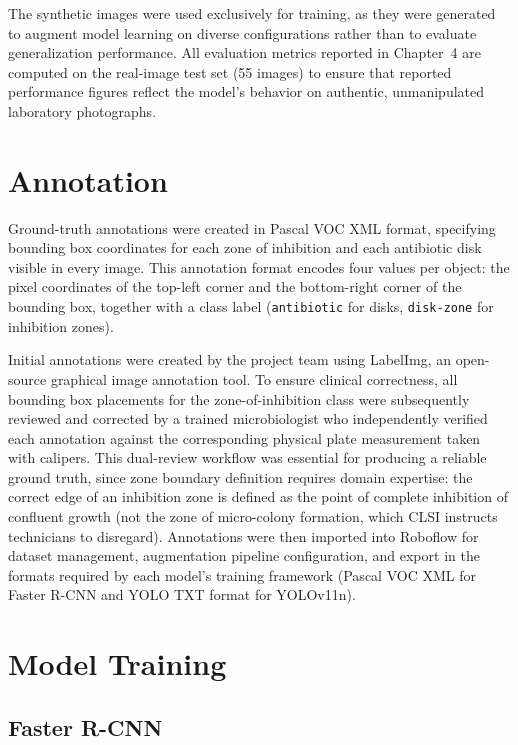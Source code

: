 The synthetic images were used exclusively for training, as they were generated to augment
model learning on diverse configurations rather than to evaluate generalization performance.
All evaluation metrics reported in Chapter~4 are computed on the real-image test set (55 images)
to ensure that reported performance figures reflect the model's behavior on authentic,
unmanipulated laboratory photographs.

\section{Annotation}

Ground-truth annotations were created in Pascal VOC XML format, specifying bounding box
coordinates for each zone of inhibition and each antibiotic disk visible in every image.
This annotation format encodes four values per object: the pixel coordinates of the
top-left corner and the bottom-right corner of the bounding box, together with a class
label (\texttt{antibiotic} for disks, \texttt{disk-zone} for inhibition zones).

Initial annotations were created by the project team using LabelImg, an open-source graphical
image annotation tool. To ensure clinical correctness, all bounding box placements for the
zone-of-inhibition class were subsequently reviewed and corrected by a trained microbiologist
who independently verified each annotation against the corresponding physical plate measurement
taken with calipers. This dual-review workflow was essential for producing a reliable ground
truth, since zone boundary definition requires domain expertise: the correct edge of an
inhibition zone is defined as the point of complete inhibition of confluent growth (not the
zone of micro-colony formation, which CLSI instructs technicians to disregard). Annotations
were then imported into Roboflow for dataset management, augmentation pipeline configuration,
and export in the formats required by each model's training framework (Pascal VOC XML for
Faster R-CNN and YOLO TXT format for YOLOv11n).

\section{Model Training}

\subsection{Faster R-CNN}

